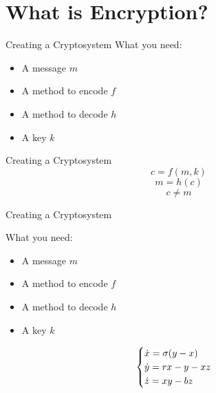 \section{What is Encryption?}
    
    \frame{\sectionpage}
    
    \begin{frame}{Creating a Cryptosystem}
        \centering
        What you need:
        \begin{itemize}
        	\item A message  $m$
        	\item A method to encode  $f$
        	\item A method to decode  $h$
        	\item A key  $k$
        \end{itemize}
    \end{frame}    
      
    \begin{frame}{Creating a Cryptosystem}
        \centering
        \begin{equation*}
            c = f ( m , k )
        \end{equation*}%
        \begin{equation*}
            m = h ( c )
        \end{equation*}%
        \begin{equation*}
            c \neq m   
        \end{equation*}
    \end{frame}
    
    \begin{frame}{Creating a Cryptosystem}
        \begin{minipage}[b]{0.45\linewidth}
            What you need:
            \begin{itemize}
            	\item A message  $m$
            	\item A method to encode  $f$
            	\item A method to decode  $h$
            	\item A key  $k$
            \end{itemize}
        \end{minipage}
        \hspace{0.5cm}
        \begin{minipage}[b]{0.45\linewidth}
            \centering
            \begin{equation*}
                \centering
                \begin{cases} 
                \dot{x} = \sigma(y-x) \\ 
                \dot{y} = rx - y - xz \\ 
                \dot{z} = xy - bz
                \end{cases}
            \end{equation*} 
        \end{minipage}
    \end{frame}